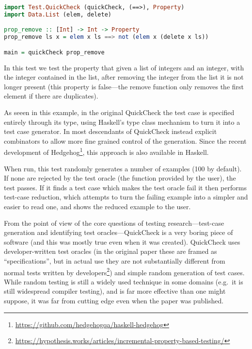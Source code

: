 \begin{lstlisting}[language=Haskell]
import Test.QuickCheck (quickCheck, (==>), Property)
import Data.List (elem, delete)

prop_remove :: [Int] -> Int -> Property
prop_remove ls x = elem x ls ==> not (elem x (delete x ls))

main = quickCheck prop_remove
\end{lstlisting}

In this test we test the property that given a list of integers and an integer,
with the integer contained in the list,
after removing the integer from the list it is not longer present (this property is false---the
remove function only removes the first element if there are duplicates).

As seeen in this example,
in the original QuickCheck the test case is specified entirely through its type,
using Haskell's type class mechanism to turn it into a test case generator.
In most descendants of QuickCheck instead explicit combinators to allow more fine grained control of the generation.
Since the recent development of Hedgehog\footnote{\url{https://github.com/hedgehogqa/haskell-hedgehog}},
this approach is also available in Haskell.

When run, this test randomly generates a number of examples (100 by default).
If none are rejected by the test oracle (the function provided by the user),
the test passes.
If it finds a test case which makes the test oracle fail it then performs test-case reduction\cite{DBLP:conf/issta/HildebrandtZ00, DBLP:conf/pldi/RegehrCCEEY12},
which attempts to turn the failing example into a simpler and easier to read one,
and shows the reduced example to the user.

From the point of view of the core questions of testing research---test-case generation and identifying test oracles---QuickCheck
is a very boring piece of software (and this was mostly true even when it was created).
QuickCheck uses developer-written test oracles (in the original paper these are framed as ``specifications'',
but in actual use they are not substantially different from normal tests written by developers\footnote{\url{https://hypothesis.works/articles/incremental-property-based-testing/}}) and simple random generation of test cases.
While random testing is still a widely used technique in some domains
(e.g.\ it is still widespread compiler testing),
and is far more effective than one might suppose\cite{DBLP:journals/tse/HamletT90, DBLP:journals/pacmpl/MajumdarN18},
it was far from cutting edge even when the paper was published.

